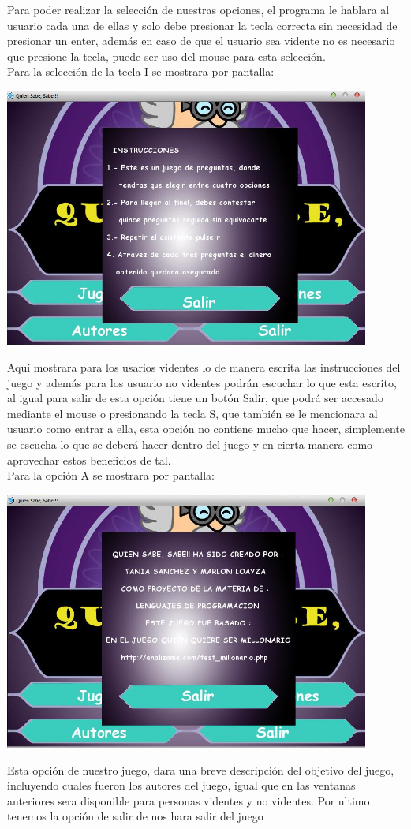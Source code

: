 \documentclass[12pt]{extbook}
\begin{document}
Para poder realizar la selección de nuestras opciones, el programa
le hablara al usuario cada una de ellas y solo debe presionar la tecla
correcta sin necesidad de presionar un enter, además en caso de que
el usuario sea vidente no es necesario que presione la tecla, puede
ser uso del mouse para esta selección. \\
\newpage
Para la selección de la tecla I se mostrara por pantalla:\\
\begin{center}
\includegraphics[width=12cm]{instrucciones.jpg}
\end{center}
Aquí mostrara para los usarios videntes lo de manera escrita las instrucciones
del juego y además para los usuario no videntes podrán escuchar lo
que esta escrito, al igual para salir de esta opción tiene un botón
Salir, que podrá ser accesado mediante el mouse o presionando la tecla
S, que también se le mencionara al usuario como entrar a ella, esta
opción no contiene mucho que hacer, simplemente se escucha lo que
se deberá hacer dentro del juego y en cierta manera como aprovechar
estos beneficios de tal.\\
\newpage
Para la opción A se mostrara por pantalla:\\
\begin{center}
\includegraphics[width=12cm]{autores.jpg}
\end{center}
Esta opción de nuestro juego, dara una breve descripción del objetivo
del juego, incluyendo cuales fueron los autores del juego, igual que
en las ventanas anteriores sera disponible para personas videntes
y no videntes. Por ultimo tenemos la opción de salir de nos hara salir
del juego\\
\end{document}
